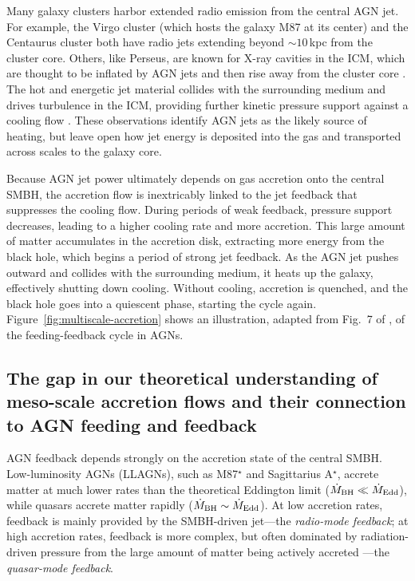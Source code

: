 Many galaxy clusters harbor extended radio emission from the central AGN jet.
For example, the Virgo cluster (which hosts the galaxy M87 at its center) and the Centaurus cluster both have radio jets extending beyond $\sim 10$\,kpc from the cluster core.
Others, like Perseus, are known for X-ray cavities in the ICM, which are thought to be inflated by AGN jets and then rise away from the cluster core \citep{fabian_chandra_2000}.
The hot and energetic jet material collides with the surrounding medium and drives turbulence in the ICM, providing further kinetic pressure support against a cooling flow \citep{hitomi_collaboration_atmospheric_2018}.
These observations identify AGN jets as the likely source of heating, but leave open how jet energy is deposited into the gas and transported across scales to the galaxy core.

Because AGN jet power ultimately depends on gas accretion onto the central SMBH, the accretion flow is inextricably linked to the jet feedback that suppresses the cooling flow.
During periods of weak feedback, pressure support decreases, leading to a higher cooling rate and more accretion.
This large amount of matter accumulates in the accretion disk, extracting more energy from the black hole, which begins a period of strong jet feedback.
As the AGN jet pushes outward and collides with the surrounding medium, it heats up the galaxy, effectively shutting down cooling.
Without cooling, accretion is quenched, and the black hole goes into a quiescent phase, starting the cycle again.
Figure~\ref{fig:multiscale-accretion} shows an illustration, adapted from Fig.~7 of \citet[][]{su_which_2021}, of the feeding-feedback cycle in AGNs.

\subsection{The gap in our theoretical understanding of meso-scale accretion flows and their connection to AGN feeding and feedback}

AGN feedback depends strongly on the accretion state of the central SMBH\@.
Low-luminosity AGNs (LLAGNs), such as M87$^{\star}$ and Sagittarius A$^{\star}$, accrete matter at much lower rates than the theoretical Eddington limit ($\dot{M}_{\rm BH} \ll \dot{M}_{\rm Edd}$), while quasars accrete matter rapidly ($\dot{M}_{\rm BH} \sim \dot{M}_{\rm Edd}$).
At low accretion rates, feedback is mainly provided by the SMBH-driven jet---the \textit{radio-mode feedback}; at high accretion rates, feedback is more complex, but often dominated by radiation-driven pressure from the large amount of matter being actively accreted \citep[e.g.,][]{cielo_agn_2018}---the \textit{quasar-mode feedback}.

